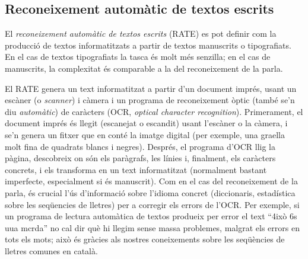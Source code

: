 \subsection{Reconeixement automàtic de textos escrits}
\label{ss:recautcar}

El \emph{reconeixement automàtic de textos escrits} (RATE) es pot definir
  com la producció de textos informatitzats a partir de textos
  manuscrits o tipografiats. En el cas de textos tipografiats la
  tasca és molt més senzilla; en el cas de manuscrits, la complexitat
  és comparable a la del reconeixement de la parla.
  
  El RATE genera un text informatitzat a partir d'un document imprés,
  usant un escàner (o \emph{scanner}) i càmera i un programa de
  reconeixement òptic (tam\-bé se'n diu {\em automàtic}) de caràcters
  (OCR, \emph{optical character recognition}).  Primerament, el
  document imprés és llegit (escanejat o escandit) usant l'escàner o
  la càmera, i se'n genera un fitxer que en conté la imatge digital
  (per exemple, una graella molt fina de quadrats blancs i negres).
  Després, el programa d'OCR llig la pàgina, descobreix on són els
  paràgrafs, les línies i, finalment, els caràcters concrets, i els
  transforma en un text informatitzat (normalment bastant imperfecte,
  especialment si és manuscrit).  Com en el cas del reconeixement de
  la parla, és crucial l'ús d'informació sobre l'idioma concret
  (diccionaris, estadística sobre les seqüencies de lletres) per a
  corregir els errors de l'OCR.  Per exemple, si un programa de
  lectura automàtica de textos produeix per error el text ``4ixò 6s
  uua mcrda'' no cal dir què hi llegim sense massa problemes, malgrat
  els errors en tots els mots; això és gràcies als nostres
  coneixements sobre les seqüències de lletres comunes en català.

